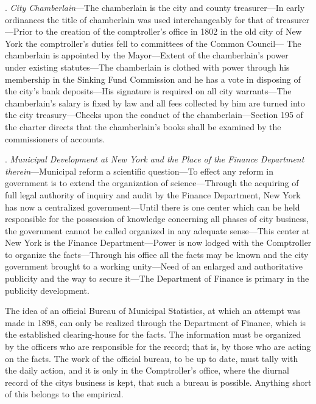 \documentclass[twoside,symmetric,nobib,justified]{tufte-book}
\begin{document}
\vspace{.15in}

.\emph{ City Chamberlain}---The chamberlain is the city and county
treasurer---In early ordinances the title of chamberlain was used
interchangeably for that of treasurer---Prior to the creation of the
comptroller's office in 1802 in the old city of New York the
comptroller's duties fell to committees of the Common Council--- The
chamberlain is appointed by the Mayor---Extent of the chamberlain's
power under existing statutes---The chamberlain is clothed with power
through his membership in the Sinking Fund Commission and he has a vote
in disposing of the city's bank deposits---His signature is required on
all city warrants---The chamberlain's salary is fixed by law and all
fees collected by him are turned into the city treasury---Checks upon
the conduct of the chamberlain---Section 195 of the charter directs that
the chamberlain's books shall be examined by the commissioners of
accounts.~

\vspace{.15in}

. \emph{Municipal Development at New York and the Place of the Finance
Department therein}---Municipal reform a scientific question---To effect
any reform in government is to extend the organization of
science---Through the acquiring of full legal authority of inquiry and
audit by the Finance Department, New York has now a centralized
government---Until there is one center which can be held responsible for
the possession of knowledge concerning all phases of city business, the
government cannot be called organized in any adequate sense---This
center at New York is the Finance Department---Power is now lodged with
the Comptroller to organize the facts---Through his office all the facts
may be known and the city government brought to a working unity---Need
of an enlarged and authoritative publicity and the way to secure
it---The Department of Finance is primary in the publicity development.~

The idea of an official Bureau of Municipal Statistics, at which an
attempt was made in 1898, can only be realized through the Department of
Finance, which is the established clearing-house for the facts. The
information must be organized by the officers who are responsible for
the record; that is, by those who are acting on the facts. The work of
the official bureau, to be up to date, must tally with the daily action,
and it is only in the Comptroller's office, where the diurnal record of
the city\textquotesingle s business is kept, that such a bureau is
possible. Anything short of this belongs to the empirical.~
\end{document}
